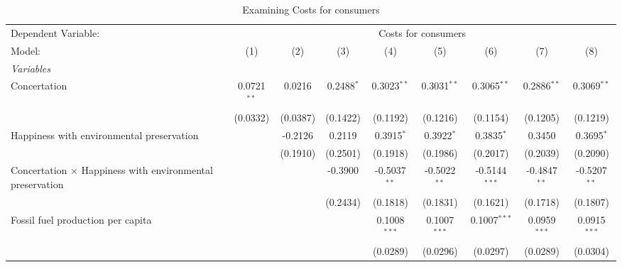 
\begin{table}[htbp]
   \caption{Examining Costs for consumers}
   \centering
   \begin{tabular}{lcccccccc}
      \tabularnewline \midrule \midrule
      Dependent Variable: & \multicolumn{8}{c}{Costs for consumers}\\
      Model:                                                           & (1)           & (2)      & (3)          & (4)            & (5)            & (6)                   & (7)            & (8)\\  
      \midrule
      \emph{Variables}\\
      Concertation                                                     & 0.0721$^{**}$ & 0.0216   & 0.2488$^{*}$ & 0.3023$^{**}$  & 0.3031$^{**}$  & 0.3065$^{**}$         & 0.2886$^{**}$  & 0.3069$^{**}$\\   
                                                                       & (0.0332)      & (0.0387) & (0.1422)     & (0.1192)       & (0.1216)       & (0.1154)              & (0.1205)       & (0.1219)\\   
      Happiness with environmental preservation                        &               & -0.2126  & 0.2119       & 0.3915$^{*}$   & 0.3922$^{*}$   & 0.3835$^{*}$          & 0.3450         & 0.3695$^{*}$\\   
                                                                       &               & (0.1910) & (0.2501)     & (0.1918)       & (0.1986)       & (0.2017)              & (0.2039)       & (0.2090)\\   
      Concertation $\times$ Happiness with environmental preservation  &               &          & -0.3900      & -0.5037$^{**}$ & -0.5022$^{**}$ & -0.5144$^{***}$       & -0.4847$^{**}$ & -0.5207$^{**}$\\   
                                                                       &               &          & (0.2434)     & (0.1818)       & (0.1831)       & (0.1621)              & (0.1718)       & (0.1807)\\   
      Fossil fuel production per capita                                &               &          &              & 0.1008$^{***}$ & 0.1007$^{***}$ & 0.1007$^{***}$        & 0.0959$^{***}$ & 0.0915$^{***}$\\   
                                                                       &               &          &              & (0.0289)       & (0.0296)       & (0.0297)              & (0.0289)       & (0.0304)\\   

\end{tabular}
\end{table}
